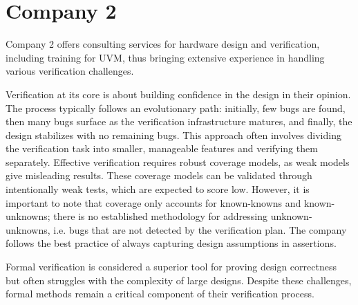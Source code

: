 \documentclass[12pt]{book}
\begin{document}
\begin{comment}
- use the different UVM runtime phases extensively, especially reset phases, to increase composition
- UVM factory is difficult to debug, and hard to maintain
- callbacks would be the bettern option but weren't available when UVM was drafted

- have their own standard scoreboard implementation

- UVM is not perfect, some companies insisted on things from their own methodology

- use configDB to pass data to agents

- RAL is not finished in their opinion
- e.g. one reg block can't be mapped into multiple address spaces
- developed their own extension

- UVM examples on the internet are often outdated
- only showcase small and trivial examples

- power aware verification is still difficult

- like idea of a framework without too many choices
\end{comment}

\section{Company 2}

Company 2 offers consulting services for hardware design and verification, including training for UVM, thus bringing extensive experience in handling various verification challenges.

Verification at its core is about building confidence in the design in their opinion. The process typically follows an evolutionary path: initially, few bugs are found, then many bugs surface as the verification infrastructure matures, and finally, the design stabilizes with no remaining bugs. This approach often involves dividing the verification task into smaller, manageable features and verifying them separately. Effective verification requires robust coverage models, as weak models give misleading results. These coverage models can be validated through intentionally weak tests, which are expected to score low. However, it is important to note that coverage only accounts for known-knowns and known-unknowns; there is no established methodology for addressing unknown-unknowns, i.e. bugs that are not detected by the verification plan. The company follows the best practice of always capturing design assumptions in assertions.

Formal verification is considered a superior tool for proving design correctness but often struggles with the complexity of large designs. Despite these challenges, formal methods remain a critical component of their verification process.
\end{document}
